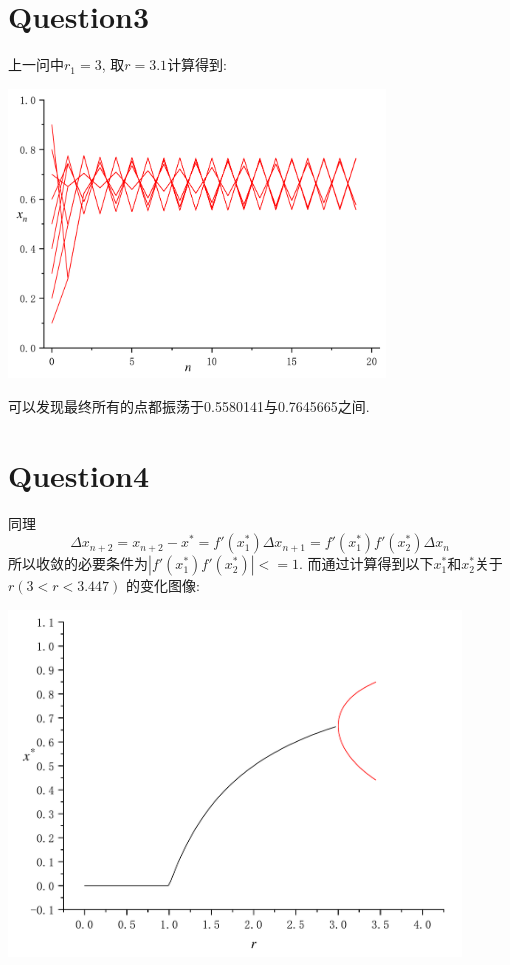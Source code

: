 \documentclass[UTF8]{ctexart}
\begin{document}
    \section{Question3}
        \indent 上一问中$r_1=3$, 取$r=3.1$计算得到:
        \begin{center}
            \includegraphics[width=10cm]{r3_1.pdf}
        \end{center}
        可以发现最终所有的点都振荡于0.5580141与0.7645665之间.
    \section{Question4}
        \indent 同理
        \begin{equation}
            \Delta x_{n+2}=x_{n+2}-x^*=f'(x^*_1)\Delta x_{n+1}=f'(x^*_1)f'(x^*_2)\Delta x_n
        \end{equation}
        所以收敛的必要条件为$\left|f'(x^*_1)f'(x^*_2)\right|<=1$. 而通过计算得到以下$x^*_1$和$x^*_2$关于$r(3<r<3.447)$
        的变化图像:
        \begin{center}
            \includegraphics[width=12cm]{t1-2.pdf}
        \end{center}
\end{document}
